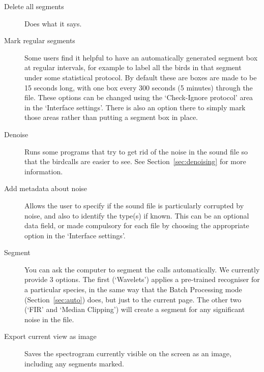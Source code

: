 \documentclass{article}
\begin{document}
\begin{description}
\item [Delete all segments] Does what it says. 
\item [Mark regular segments] Some users find it helpful to have an automatically generated segment box at regular intervals, for example to label all the birds in that segment under some statistical protocol. By default these are boxes are made to be 15 seconds long, with one box every 300 seconds (5 minutes) through the file. These options can be changed using the `Check-Ignore protocol' area in the `Interface settings'. There is also an option there to simply mark those areas rather than putting a segment box in place.
\item [Denoise] Runs some programs that try to get rid of the noise in the sound file so that the birdcalls are easier to see. %
See Section~\ref{sec:denoising} for more information.
\item [Add metadata about noise] Allows the user to specify if the sound file is particularly corrupted by noise, and also to identify the type(s) if known. This can be an optional data field, or made compulsory for each file by choosing the appropriate option in the `Interface settings'.
\item [Segment] You can ask the computer to segment the calls automatically. We currently provide 3 options. The first (`Wavelets') applies a pre-trained recogniser for a particular species, in the same way that the Batch Processing mode (Section~\ref{sec:auto}) does, but just to the current page. The other two (`FIR' and `Median Clipping') will create a segment for any significant noise in the file. 
\item [Export current view as image] Saves the spectrogram currently visible on the screen as an image, including any segments marked. 
\end{description}
\end{document}
